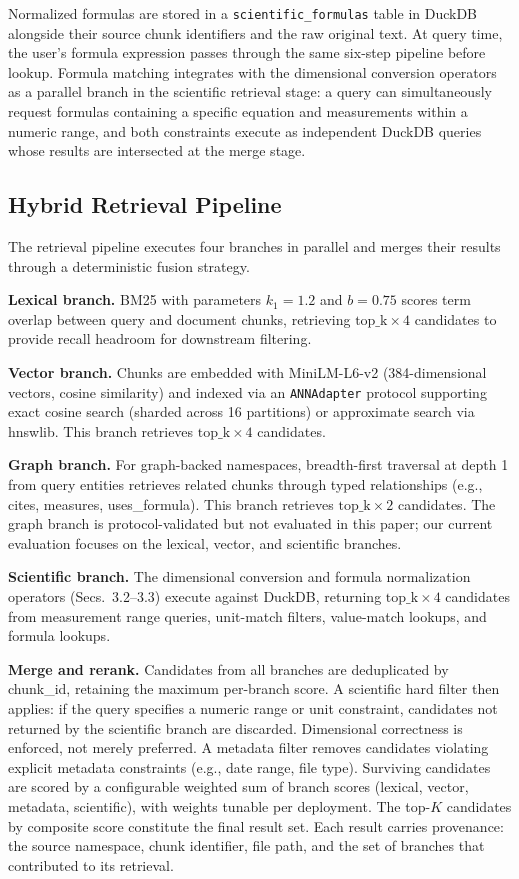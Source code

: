Normalized formulas are stored in a \texttt{scientific\_formulas} table in DuckDB alongside their source chunk identifiers and the raw original text. At query time, the user's formula expression passes through the same six-step pipeline before lookup. Formula matching integrates with the dimensional conversion operators as a parallel branch in the scientific retrieval stage: a query can simultaneously request formulas containing a specific equation and measurements within a numeric range, and both constraints execute as independent DuckDB queries whose results are intersected at the merge stage.

\subsection{Hybrid Retrieval Pipeline}

The retrieval pipeline executes four branches in parallel and merges their results through a deterministic fusion strategy.

\textbf{Lexical branch.} BM25 with parameters $k_1 = 1.2$ and $b = 0.75$ scores term overlap between query and document chunks, retrieving $\text{top\_k} \times 4$ candidates to provide recall headroom for downstream filtering.

\textbf{Vector branch.} Chunks are embedded with MiniLM-L6-v2 (384-dimensional vectors, cosine similarity) and indexed via an \texttt{ANNAdapter} protocol supporting exact cosine search (sharded across 16 partitions) or approximate search via hnswlib. This branch retrieves $\text{top\_k} \times 4$ candidates.

\textbf{Graph branch.} For graph-backed namespaces, breadth-first traversal at depth 1 from query entities retrieves related chunks through typed relationships (e.g., cites, measures, uses\_formula). This branch retrieves $\text{top\_k} \times 2$ candidates. The graph branch is protocol-validated but not evaluated in this paper; our current evaluation focuses on the lexical, vector, and scientific branches.

\textbf{Scientific branch.} The dimensional conversion and formula normalization operators (Secs.~3.2--3.3) execute against DuckDB, returning $\text{top\_k} \times 4$ candidates from measurement range queries, unit-match filters, value-match lookups, and formula lookups.

\textbf{Merge and rerank.} Candidates from all branches are deduplicated by chunk\_id, retaining the maximum per-branch score. A scientific hard filter then applies: if the query specifies a numeric range or unit constraint, candidates not returned by the scientific branch are discarded. Dimensional correctness is enforced, not merely preferred. A metadata filter removes candidates violating explicit metadata constraints (e.g., date range, file type). Surviving candidates are scored by a configurable weighted sum of branch scores (lexical, vector, metadata, scientific), with weights tunable per deployment. The top-$K$ candidates by composite score constitute the final result set. Each result carries provenance: the source namespace, chunk identifier, file path, and the set of branches that contributed to its retrieval.

